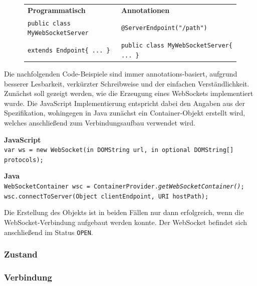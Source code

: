 \documentclass[11pt,a4paper,titlepage]{scrartcl}
\numberwithin{equation}{section}
\begin{document}
\begin{figure}[ht]
	\begin{center}
		\begin{tabular}{>{\arraybackslash}p{7cm}l}
			\textbf{Programmatisch} & \textbf{Annotationen} \\
			\texttt{public class MyWebSocketServer} & \texttt{@ServerEndpoint("{}/path"{})} \\
		 \texttt{extends Endpoint\{ ... \}}	& \texttt{public class MyWebSocketServer\{ ... \}}
		\end{tabular}
	\end{center}
	\label{fig:wsAPIProgrAnnot}
\end{figure}

\noindent Die nachfolgenden Code-Beispiele sind immer annotations-basiert, aufgrund besserer Lesbarkeit, verkürzter Schreibweise und der einfachen Verständlichkeit. \\

\noindent Zunächst soll gezeigt werden, wie die Erzeugung eines WebSockets implementiert wurde. 
Die JavaScript Implementierung entspricht dabei den Angaben aus der Spezifikation, wohingegen in Java zunächst ein Container-Objekt erstellt wird, welches anschließend zum Verbindungsaufbau verwendet wird.
\begin{center}
\noindent\textbf{JavaScript}\\
\noindent\texttt{var ws = new WebSocket(in DOMString url,
	in optional DOMString[] protocols);}
\end{center}
\begin{center}
	\noindent\textbf{Java}\\
	\noindent\texttt{WebSocketContainer wsc = ContainerProvider.\textit{getWebSocketContainer()};}\\
	\noindent\texttt{wsc.connectToServer(Object clientEndpoint, URI hostPath);}\\
\end{center}

\noindent Die Erstellung des Objekts ist in beiden Fällen nur dann erfolgreich, wenn die WebSocket-Verbindung aufgebaut werden konnte. Der WebSocket befindet sich anschließend im Status \texttt{OPEN}.

\subsubsection{Zustand}

\subsubsection{Verbindung}
\end{document}
